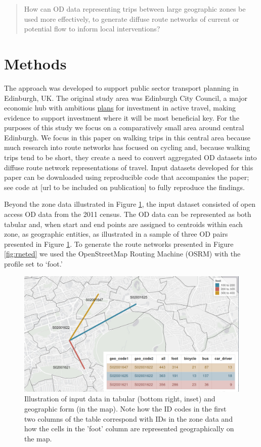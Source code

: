 \documentclass[
]{article}
\begin{document}
\begin{quote}
How can OD data representing trips between large geographic zones be used more effectively, to generate diffuse route networks of current or potential flow to inform local interventions?
\end{quote}

\hypertarget{methods}{%
\section{Methods}\label{methods}}

The approach was developed to support public sector transport planning in Edinburgh, UK.
The original study area was Edinburgh City Council, a major economic hub with ambitious \href{https://www.edinburgh.gov.uk/downloads/file/30073/active-travel-investment-programme-update-october-2021}{plans} for investment in active travel, making evidence to support investment where it will be most beneficial key.
For the purposes of this study we focus on a comparatively small area around central Edinburgh.
We focus in this paper on walking trips in this central area because much research into route networks has focused on cycling and, because walking trips tend to be short, they create a need to convert aggregated OD datasets into diffuse route network representations of travel.
Input datasets developed for this paper can be downloaded using reproducible code that accompanies the paper; see code at {[}url to be included on publication{]} to fully reproduce the findings.

Beyond the zone data illustrated in Figure \ref{fig:od}, the input dataset consisted of open access OD data from the 2011 census.
The OD data can be represented as both tabular and, when start and end points are assigned to centroids within each zone, as geographic entities, as illustrated in a sample of three OD pairs presented in Figure \ref{fig:od}.
To generate the route networks presented in Figure \ref{fig:rneted} we used the OpenStreetMap Routing Machine (OSRM) with the profile set to `foot.'

\begin{figure}

{\centering \includegraphics[width=0.8\linewidth]{figures/od-top-3-zones-metafigure} 

}

\caption{Illustration of input data in tabular (bottom right, inset) and geographic form (in the map). Note how the ID codes in the first two columns of the table correspond with IDs in the zone data and how the cells in the 'foot' column are represented geographically on the map.}\label{fig:od}
\end{figure}
\end{document}
